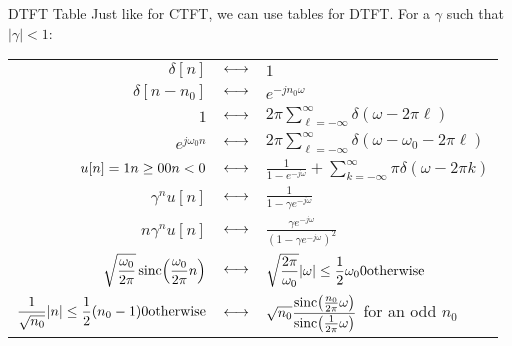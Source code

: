 \documentclass[a4paper]{article}
\begin{document}
\begin{parag}{DTFT Table}
    Just like for CTFT, we can use tables for DTFT. For a $\gamma$ such that $\left|\gamma\right| < 1$:
    \begin{center}
    \begin{tabular}{|rcl|}
        \hline
        $\displaystyle \delta \left[n\right]$ & $\longleftrightarrow$ & $\displaystyle 1$ \\
        $\displaystyle \delta \left[n - n_0\right]$ & $\longleftrightarrow$ & $\displaystyle e^{-j n_0 \omega}$ \\
        \hline
        $\displaystyle 1 $ & $\longleftrightarrow$ & $\displaystyle 2\pi \sum_{\ell = -\infty}^{\infty} \delta\left(\omega - 2\pi \ell \right)$  \\
        $\displaystyle e^{j \omega_0 n}$ & $\longleftrightarrow$ & $\displaystyle 2\pi \sum_{\ell = -\infty}^{\infty} \delta\left(\omega - \omega_0 - 2\pi \ell \right)$  \\
        \hline
        $\displaystyle u\left[n\right] = \expandafter\noexpand\piecewisefunc{1}{n \geq 0}{0}{n < 0}$ & $\longleftrightarrow$ & $\displaystyle \frac{1}{1 - e^{-j \omega}} + \sum_{k=-\infty}^{\infty} \pi \delta\left(\omega - 2\pi k\right)$  \\
        \hline
        $\displaystyle \gamma^n u\left[n\right]$ & $\longleftrightarrow$ & $\displaystyle \frac{1}{1 - \gamma e^{-j \omega}}$  \\
        $\displaystyle n \gamma^n u\left[n\right]$ & $\longleftrightarrow$ & $\displaystyle \frac{\gamma e^{-j \omega}}{\left(1 - \gamma e^{- j \omega}\right)^2}$  \\
        \hline
        $\displaystyle \sqrt{\frac{\omega_0}{2\pi}} \sinc\left(\frac{\omega_0}{2\pi} n\right)$ & $\longleftrightarrow$ & $\displaystyle \expandafter\noexpand\piecewisefunc{\sqrt{\frac{2\pi}{\omega_0}}}{\left|\omega\right| \leq \frac{1}{2} \omega_0}{0}{\text{otherwise}}$  \\
        \hline
        $\displaystyle \expandafter\noexpand\piecewisefunc{\frac{1}{\sqrt{n_0}}}{\left|n\right| \leq \frac{1}{2}\left(n_0 - 1\right)}{0}{\text{otherwise}}$ & $\longleftrightarrow$ & $\displaystyle \sqrt{n_0} \frac{\sinc\left(\frac{n_0}{2\pi} \omega\right)}{\sinc\left(\frac{1}{2\pi} \omega\right)}$ for an odd $n_0$ \\
        \hline
    \end{tabular}
    \end{center}
\end{parag}
\end{document}
